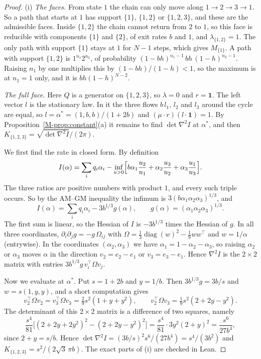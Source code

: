 \documentclass[EJP,preprint]{ejpecp}
\newcommand{\mref}[1]{\ref*{M-#1}}
\newcommand{\ones}{\mathbf{1}}
\begin{document}
\begin{proof}
(i) \emph{The faces.} From state $1$ the chain can only move along $1\to2\to3\to1$. So a path
that starts at $1$ has support $\{1\}$, $\{1,2\}$ or $\{1,2,3\}$, and these are the admissible
faces. Inside $\{1,2\}$ the chain cannot return from $2$ to $1$, so this face is reducible with
components $\{1\}$ and $\{2\}$, of exit rates $b$ and $1$, and $\lambda_{\{1,2\}}=1$. The only
path with support $\{1\}$ stays at $1$ for $N-1$ steps, which gives $M_{\{1\}}$. A path with
support $\{1,2\}$ is $1^{n_1}2^{n_2}$, of probability $(1-bh)^{n_1-1}\,bh\,(1-h)^{n_2-1}$.
Raising $n_1$ by one multiplies this by $(1-bh)/(1-h)<1$, so the maximum is at $n_1=1$ only,
and it is $bh(1-h)^{N-2}$.

\emph{The full face.} Here $Q$ is a generator on $\{1,2,3\}$, so $\lambda=0$ and $r=\ones$. The
left vector $l$ is the stationary law. In it the three flows $b\,l_1$, $l_2$ and $l_3$ around the
cycle are equal, so $l=\alpha^*=(1,b,b)/(1+2b)$ and $(\mu\cdot r)(l\cdot\ones)=1$. By
Proposition~\mref{prop:constant}(a) it remains to find $\det\nabla^2I$ at $\alpha^*$, and then
$K_{\{1,2,3\}}=\sqrt{\det\nabla^2I}/(2\pi)$.

We first find the rate in closed form. By definition
\[
I(\alpha)=\sum_iq_i\alpha_i-\inf_{u>0}\Bigl[b\alpha_1\frac{u_2}{u_1}+\alpha_2\frac{u_3}{u_2}
+\alpha_3\frac{u_1}{u_3}\Bigr].
\]
The three ratios are positive numbers with product $1$, and every such triple occurs. So by the
AM--GM inequality the infimum is $3(b\alpha_1\alpha_2\alpha_3)^{1/3}$, and
\[
I(\alpha)=\sum_iq_i\alpha_i-3b^{1/3}g(\alpha),\qquad g(\alpha)=(\alpha_1\alpha_2\alpha_3)^{1/3}.
\]
The first sum is linear, so the Hessian of $I$ is $-3b^{1/3}$ times the Hessian of $g$. In all
three coordinates, $\partial_i\partial_jg=-g\,\Omega_{ij}$ with
$\Omega=\frac13\operatorname{diag}(w)^2-\frac19ww^\top$ and $w=1/\alpha$ (entrywise). In the
coordinates $(\alpha_2,\alpha_3)$ we have $\alpha_1=1-\alpha_2-\alpha_3$, so raising $\alpha_2$ or
$\alpha_3$ moves $\alpha$ in the direction $v_2=e_2-e_1$ or $v_3=e_3-e_1$. Hence $\nabla^2I$ is
the $2\times2$ matrix with entries $3b^{1/3}g\,v_i^\top\Omega v_j$.

Now we evaluate at $\alpha^*$. Put $s=1+2b$ and $y=1/b$. Then $3b^{1/3}g=3b/s$ and
$w=s(1,y,y)$, and a short computation gives
\[
v_2^\top\Omega v_2=v_3^\top\Omega v_3=\tfrac29s^2(1+y+y^2),\qquad
v_2^\top\Omega v_3=\tfrac19s^2(2+2y-y^2).
\]
The determinant of this $2\times2$ matrix is a difference of two squares, namely
\[
\frac{s^4}{81}\bigl[(2+2y+2y^2)^2-(2+2y-y^2)^2\bigr]=\frac{s^4}{81}\cdot3y^2(2+y)^2
=\frac{s^6}{27b^4},
\]
since $2+y=s/b$. Hence $\det\nabla^2I=(3b/s)^2s^6/(27b^4)=s^4/(3b^2)$ and
$K_{\{1,2,3\}}=s^2/(2\sqrt3\,\pi b)$. The exact parts of (i) are checked in Lean.


\end{proof}
\end{document}

